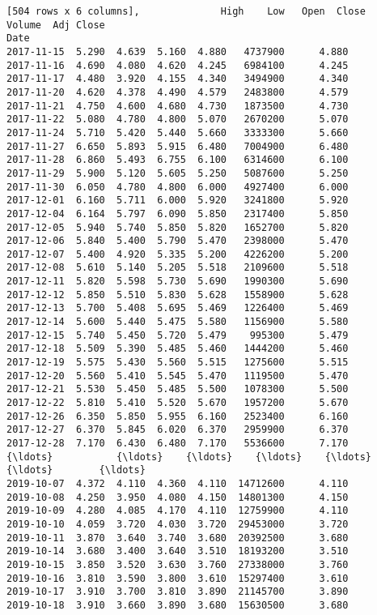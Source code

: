 \documentclass[11pt]{article}
\begin{document}
\begin{Verbatim}[commandchars=\\\{\}]
[504 rows x 6 columns],              High    Low   Open  Close    Volume  Adj Close
Date                                                       
2017-11-15  5.290  4.639  5.160  4.880   4737900      4.880
2017-11-16  4.690  4.080  4.620  4.245   6984100      4.245
2017-11-17  4.480  3.920  4.155  4.340   3494900      4.340
2017-11-20  4.620  4.378  4.490  4.579   2483800      4.579
2017-11-21  4.750  4.600  4.680  4.730   1873500      4.730
2017-11-22  5.080  4.780  4.800  5.070   2670200      5.070
2017-11-24  5.710  5.420  5.440  5.660   3333300      5.660
2017-11-27  6.650  5.893  5.915  6.480   7004900      6.480
2017-11-28  6.860  5.493  6.755  6.100   6314600      6.100
2017-11-29  5.900  5.120  5.605  5.250   5087600      5.250
2017-11-30  6.050  4.780  4.800  6.000   4927400      6.000
2017-12-01  6.160  5.711  6.000  5.920   3241800      5.920
2017-12-04  6.164  5.797  6.090  5.850   2317400      5.850
2017-12-05  5.940  5.740  5.850  5.820   1652700      5.820
2017-12-06  5.840  5.400  5.790  5.470   2398000      5.470
2017-12-07  5.400  4.920  5.335  5.200   4226200      5.200
2017-12-08  5.610  5.140  5.205  5.518   2109600      5.518
2017-12-11  5.820  5.598  5.730  5.690   1990300      5.690
2017-12-12  5.850  5.510  5.830  5.628   1558900      5.628
2017-12-13  5.700  5.408  5.695  5.469   1226400      5.469
2017-12-14  5.600  5.440  5.475  5.580   1156900      5.580
2017-12-15  5.740  5.450  5.720  5.479    995300      5.479
2017-12-18  5.509  5.390  5.485  5.460   1444200      5.460
2017-12-19  5.575  5.430  5.560  5.515   1275600      5.515
2017-12-20  5.560  5.410  5.545  5.470   1119500      5.470
2017-12-21  5.530  5.450  5.485  5.500   1078300      5.500
2017-12-22  5.810  5.410  5.520  5.670   1957200      5.670
2017-12-26  6.350  5.850  5.955  6.160   2523400      6.160
2017-12-27  6.370  5.845  6.020  6.370   2959900      6.370
2017-12-28  7.170  6.430  6.480  7.170   5536600      7.170
{\ldots}           {\ldots}    {\ldots}    {\ldots}    {\ldots}       {\ldots}        {\ldots}
2019-10-07  4.372  4.110  4.360  4.110  14712600      4.110
2019-10-08  4.250  3.950  4.080  4.150  14801300      4.150
2019-10-09  4.280  4.085  4.170  4.110  12759900      4.110
2019-10-10  4.059  3.720  4.030  3.720  29453000      3.720
2019-10-11  3.870  3.640  3.740  3.680  20392500      3.680
2019-10-14  3.680  3.400  3.640  3.510  18193200      3.510
2019-10-15  3.850  3.520  3.630  3.760  27338000      3.760
2019-10-16  3.810  3.590  3.800  3.610  15297400      3.610
2019-10-17  3.910  3.700  3.810  3.890  21145700      3.890
2019-10-18  3.910  3.660  3.890  3.680  15630500      3.680

\end{Verbatim}
\end{document}
